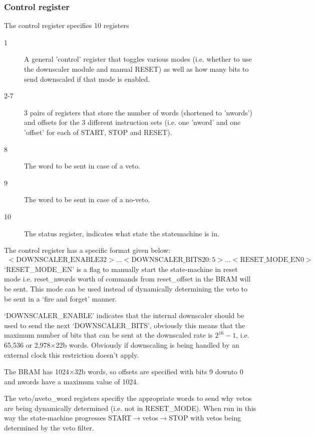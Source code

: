 \documentclass[]{article}
\begin{document}
    \subsubsection{Control register} %
    \label{sub:ctrl_reg}
      The control register specifies 10 registers
      \begin{description}
        \item[1] A general 'control' register that toggles various modes (i.e. whether to use the downscaler module and manual RESET) as well as how many bits to send downscaled if that mode is enabled.
        \item[2-7] 3 pairs of registers that store the number of words (shortened to 'nwords') and offsets for the 3 different instruction sets (i.e. one 'nword' and one 'offset' for each of START, STOP and RESET).
        \item[8] The word to be sent in case of a veto.
        \item[9] The word to be sent in case of a no-veto.
        \item[10] The status register, indicates what state the statemachine is in.
      \end{description}
      The control register has a specific format given below:
      \begin{align} \label{fmt:control_reg}
        <\text{DOWNSCALER\_ENABLE} 32>\ldots<\text{DOWNSCALER\_BITS} 20:5>\ldots<\text{RESET\_MODE\_EN} 0>
      \end{align}
      `RESET\_MODE\_EN' is a flag to manually start the state-machine in reset mode i.e. reset\_nwords worth of commands from reset\_offset in the BRAM will be sent. This mode can be used instead of dynamically determining the veto to be sent in a `fire and forget' manner.

      `DOWNSCALER\_ENABLE' indicates that the internal downscaler should be used to send the next `DOWNSCALER_BITS', obviously this means that the maximum number of bits that can be sent at the downscaled rate is \(2^16 - 1\), i.e. 65,536 or 2,978\(\times\)22b words. Obviously if downscaling is being handled by an external clock this restriction doesn't apply.

      The BRAM has 1024\( \times \)32b words, so offsets are specified with bits 9 downto 0 and nwords have a maximum value of 1024. 

      The veto/nveto\_word registers specifiy the appropriate words to send why vetos are being dynamically determined (i.e. not in RESET\_MODE). When run in this way the state-machine progresses START\(\rightarrow\)vetos\(\rightarrow\)STOP with vetos being determined by the veto filter.
      
\end{document}
